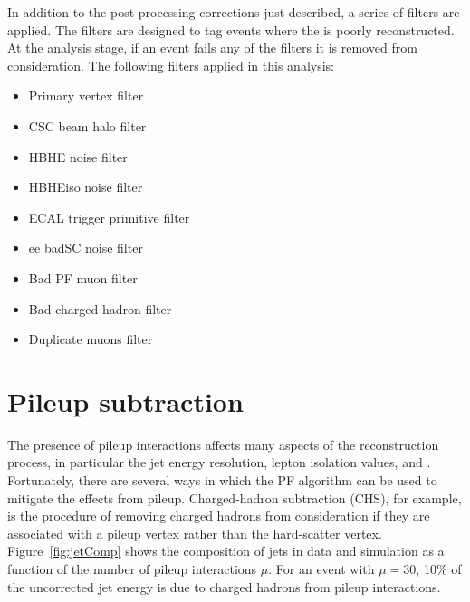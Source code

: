 In addition to the post-processing corrections just described, a series of \ETmiss filters are applied. The filters are designed to tag events where the \ETmiss is poorly reconstructed. At the analysis stage, if an event fails any of the \ETmiss filters it is removed from consideration. The following \ETmiss filters applied in this analysis:
\begin{itemize}
\item Primary vertex filter
\item CSC beam halo filter
\item HBHE noise filter
\item HBHEiso noise filter
\item ECAL trigger primitive filter
\item ee badSC noise filter
\item Bad PF muon filter
\item Bad charged hadron filter
\item Duplicate muons filter
\end{itemize}


\section{Pileup subtraction}
\label{sec:pileup}

The presence of pileup interactions affects many aspects of the reconstruction process, in particular the jet energy resolution, lepton isolation values, and \ETmiss. Fortunately, there are several ways in which the PF algorithm can be used to mitigate the effects from pileup. Charged-hadron subtraction (CHS), for example, is the procedure of removing charged hadrons from consideration if they are associated with a pileup vertex rather than the hard-scatter vertex. Figure~\ref{fig:jetComp} shows the composition of jets in data and simulation as a function of the number of pileup interactions $\mu$. For an event with $\mu = 30$, 10\% of the uncorrected jet energy is due to charged hadrons from pileup interactions. 

